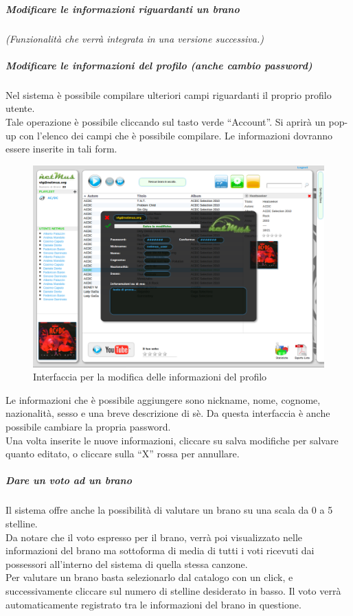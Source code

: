 \subparagraph{Modificare le informazioni riguardanti un brano}

\emph{(Funzionalità che verrà integrata in una versione successiva.)}

\subparagraph{Modificare le informazioni del profilo (anche cambio password)}

Nel sistema  \`e possibile compilare ulteriori campi riguardanti il
proprio profilo utente.\\
Tale operazione \`e possibile cliccando sul tasto verde ``Account''. Si aprir\`a
un pop-up con l'elenco dei campi che \`e possibile compilare. Le informazioni
dovranno essere inserite in tali form.
\begin{figure}[htbp]
  \centering
  \includegraphics[width=15cm]{img/MU/profile_view.png}
\caption{Interfaccia per la modifica delle informazioni del profilo}
\end{figure}

Le informazioni che \`e possibile aggiungere sono nickname, nome, cognome,
nazionalit\`a, sesso e una breve descrizione di s\`e. Da questa interfaccia \`e
anche possibile cambiare la propria password.\\
Una volta inserite le nuove informazioni, cliccare su salva modifiche per
salvare quanto editato, o cliccare sulla ``X'' rossa per annullare.

\subparagraph{Dare un voto ad un brano}

Il sistema  offre anche la possibilit\`a di valutare un brano su una
scala da 0 a 5 stelline.\\
Da notare che il voto espresso per il brano, verr\`a poi visualizzato nelle
informazioni del brano ma sottoforma di media di tutti i voti ricevuti dai
possessori all'interno del sistema  di quella stessa canzone.\\
Per valutare un brano basta selezionarlo dal catalogo con un click, e
successivamente cliccare sul numero di stelline desiderato in basso. Il voto
verr\`a automaticamente registrato tra le informazioni del brano in questione.

